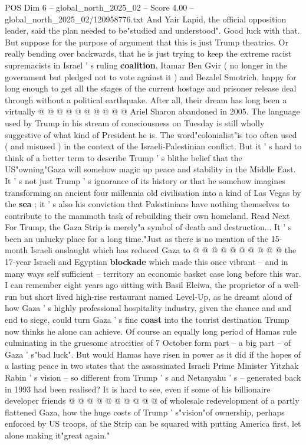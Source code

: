 \begin{textsample}{POS Dim 6 – global\_north\_2025\_02 – Score 4.00 – global\_north\_2025\_02/120958776.txt}
And Yair Lapid, the official opposition leader, said the plan needed to be"studied and understood".
Good luck with that.
But suppose for the purpose of argument that this is just Trump theatrics.
Or really bending over backwards, that he is just trying to keep the extreme racist supremacists in Israel ' s ruling \textbf{coalition}, Itamar Ben Gvir ( no longer in the government but pledged not to vote against it ) and Bezalel Smotrich, happy for long enough to get all the stages of the current hostage and prisoner release deal through without a political earthquake.
After all, their dream has long been a virtually @ @ @ @ @ @ @ @ @ @ Ariel Sharon abandoned in 2005.
The language used by Trump in his stream of consciousness on Tuesday is still wholly suggestive of what kind of President he is.
The word"colonialist"is too often used ( and misused ) in the context of the Israeli-Palestinian conflict.
But it ' s hard to think of a better term to describe Trump ' s blithe belief that the US"owning"Gaza will somehow magic up peace and stability in the Middle East.
It ' s not just Trump ' s ignorance of its history or that he somehow imagines transforming an ancient four millennia old civilisation into a kind of Las Vegas by the \textbf{sea} ; it ' s also his conviction that Palestinians have nothing themselves to contribute to the mammoth task of rebuilding their own homeland.
Read Next For Trump, the Gaza Strip is merely"a symbol of death and destruction...
It ' s been an unlucky place for a long time."Just as there is no mention of the 15-month Israeli onslaught which has reduced Gaza to @ @ @ @ @ @ @ @ @ @ the 17-year Israeli and Egyptian \textbf{blockade} which made this once vibrant -- and in many ways self sufficient -- territory an economic basket case long before this war.
I can remember eight years ago sitting with Basil Eleiwa, the proprietor of a well-run but short lived high-rise restaurant named Level-Up, as he dreamt aloud of how Gaza ' s highly professional hospitality industry, given the chance and and end to siege, could turn Gaza ' s fine \textbf{coast} into the tourist destination Trump now thinks he alone can achieve.
Of course an equally long period of Hamas rule culminating in the gruesome atrocities of 7 October form part -- a big part -- of Gaza ' s"bad luck".
But would Hamas have risen in power as it did if the hopes of a lasting peace in two states that the assassinated Israeli Prime Minister Yitzhak Rabin ' s vision -- so different from Trump ' s and Netanyahu ' s -- generated back in 1993 had been realised?
It is hard to see, even if some of his billionaire developer friends @ @ @ @ @ @ @ @ @ @ of wholesale redevelopment of a partly flattened Gaza, how the huge costs of Trump ' s"vision"of ownership, perhaps enforced by US troops, of the Strip can be squared with putting America first, let alone making it"great again."

\end{textsample}
